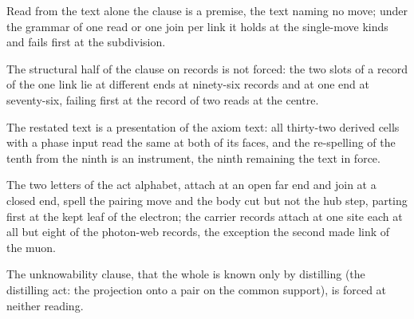 \begin{chwall}\label{box:I-1-axiom-and-the-six-definitions:4}
Read from the text alone the clause is a premise, the text naming no move; under the grammar of one read or one join per link it holds at the single-move kinds and fails first at the subdivision.
\end{chwall}
\begin{chwall}\label{box:I-1-axiom-and-the-six-definitions:5}
The structural half of the clause on records is not forced: the two slots of a record of the one link lie at different ends at ninety-six records and at one end at seventy-six, failing first at the record of two reads at the centre.
\end{chwall}
\begin{chtheorem}\label{box:I-1-axiom-and-the-six-definitions:6}
The restated text is a presentation of the axiom text: all thirty-two derived cells with a phase input read the same at both of its faces, and the re-spelling of the tenth from the ninth is an instrument, the ninth remaining the text in force.
\end{chtheorem}
\begin{chwall}\label{box:I-1-axiom-and-the-six-definitions:7}
The two letters of the act alphabet, attach at an open far end and join at a closed end, spell the pairing move and the body cut but not the hub step, parting first at the kept leaf of the electron; the carrier records attach at one site each at all but eight of the photon-web records, the exception the second made link of the muon.
\end{chwall}
\begin{chwall}\label{box:I-1-axiom-and-the-six-definitions:8}
The unknowability clause, that the whole is known only by distilling (the distilling act: the projection onto a pair on the common support), is forced at neither reading.
\end{chwall}
